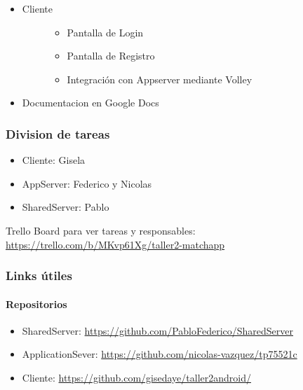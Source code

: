 \documentclass[letterpaper,10pt,english]{sphinxmanual}
\begin{document}
\begin{itemize}
\item {} \begin{description}
\item[{Cliente}] \leavevmode\begin{itemize}
\item {} 
Pantalla de Login

\item {} 
Pantalla de Registro

\item {} 
Integración con Appserver mediante Volley

\end{itemize}

\end{description}

\item {} 
Documentacion en Google Docs

\end{itemize}


\subsubsection{Division de tareas}
\label{manuals:division-de-tareas}\begin{itemize}
\item {} 
Cliente: Gisela

\item {} 
AppServer: Federico y Nicolas

\item {} 
SharedServer: Pablo

\end{itemize}

Trello Board para ver tareas y responsables:
\href{https://trello.com/b/MKvp61Xg/taller2-matchapp}{https://trello.com/b/MKvp61Xg/taller2-matchapp}


\subsubsection{Links útiles}
\label{manuals:links-utiles}

\paragraph{Repositorios}
\label{manuals:repositorios}\begin{itemize}
\item {} 
SharedServer: \href{https://github.com/PabloFederico/SharedServer}{https://github.com/PabloFederico/SharedServer}

\item {} 
ApplicationSever: \href{https://github.com/nicolas-vazquez/tp75521c}{https://github.com/nicolas-vazquez/tp75521c}

\item {} 
Cliente: \href{https://github.com/gisedaye/taller2android/}{https://github.com/gisedaye/taller2android/}

\end{itemize}
\end{document}
